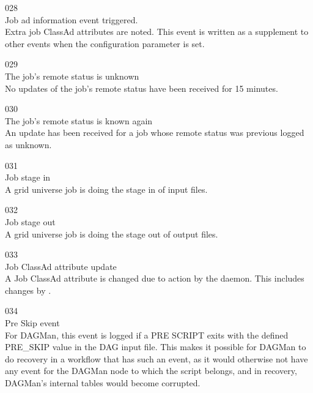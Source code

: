 \noindent{} 028 \\
 Job ad information event triggered. \\
 Extra job ClassAd attributes are noted. This event is
written as a supplement to other events when the configuration
parameter  is set.

\noindent{} 029 \\
 The job's remote status is unknown \\
 No updates of the job's remote status
have been received for 15 minutes.

\noindent{} 030 \\
 The job's remote status is known again \\
 An update has been received for a job whose
remote status was previous logged as unknown.

\noindent{} 031 \\
 Job stage in \\
 A grid universe job is doing the stage in of 
input files.

\noindent{} 032 \\
 Job stage out \\
 A grid universe job is doing the  stage out of
output files.

\noindent{} 033 \\
 Job ClassAd attribute update \\
 A Job ClassAd attribute is changed due to action
by the  daemon.  
This includes changes by .

\noindent{} 034 \\
 Pre Skip event \\
 For DAGMan, this event is logged
if a PRE SCRIPT exits with the defined PRE\_SKIP value in the DAG input file.
This makes it possible for DAGMan to do recovery in a workflow that has
such an event, 
as it would otherwise not have any event for the DAGMan node to
which the script belongs, 
and in recovery, DAGMan's internal tables would become corrupted.

